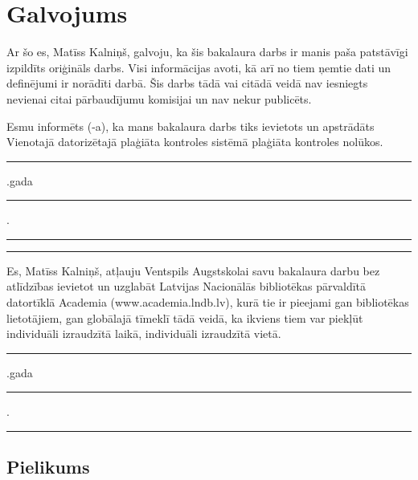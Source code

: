 \documentclass{VEA}
\begin{document}
\chapter*{Galvojums}
\sloppy
\noindent Ar šo es, Matīss Kalniņš, galvoju, ka šis bakalaura darbs ir manis paša patstāvīgi 
izpildīts oriģināls darbs. Visi informācijas avoti, kā arī no tiem ņemtie dati un
definējumi ir norādīti darbā. Šis darbs tādā vai citādā veidā nav iesniegts nevienai
citai pārbaudījumu komisijai un nav nekur publicēts.

Esmu informēts (-a), ka mans bakalaura darbs tiks ievietots un apstrādāts
Vienotajā datorizētajā plaģiāta kontroles sistēmā plaģiāta kontroles nolūkos.

\vspace{1in}
\rule{0.5cm}{0.2pt}.gada \rule{1cm}{0.2pt}.\rule{3cm}{0.2pt} \tabto{10cm} \rule{5cm}{0.2pt}
\vspace{0.5in}

Es, Matīss Kalniņš, atļauju Ventspils Augstskolai savu bakalaura darbu bez
atlīdzības ievietot un uzglabāt Latvijas Nacionālās bibliotēkas pārvaldītā datortīklā
Academia (www.academia.lndb.lv), kurā tie ir pieejami gan bibliotēkas lietotājiem,
gan globālajā tīmeklī tādā veidā, ka ikviens tiem var piekļūt individuāli izraudzītā
laikā, individuāli izraudzītā vietā.

\vspace{0.5in}
\vspace{0.5in}
\rule{0.5cm}{0.2pt}.gada \rule{1cm}{0.2pt}.\rule{3cm}{0.2pt} 

\label{LastPage}

\begin{appendices}
\chapter*{Pielikums}

\end{appendices}
\end{document}
